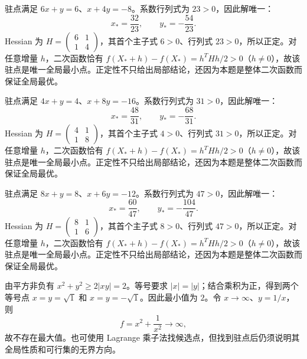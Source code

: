 \documentclass[UTF8,12pt,a4paper,fontset=fandol]{ctexart}
\begin{document}
\begin{solve}\label{ans:c34q17}
驻点满足 $6x+y=6$、$x+4y=-8$。系数行列式为 $23>0$，因此解唯一：
\[
x_*=\frac{32}{23},\qquad y_*=-\frac{54}{23}.
\]
Hessian 为 $H=\begin{pmatrix}6&1\\1&4\end{pmatrix}$，其首个主子式 $6>0$、行列式 $23>0$，所以正定。对任意增量 $h$，二次函数恰有 $f(X_*+h)-f(X_*)=h^THh/2>0$（$h\ne0$），故该驻点是唯一全局最小点。正定性不只给出局部结论，还因为本题是整体二次函数而保证全局最优。
\end{solve}

\begin{solve}\label{ans:c34q18}
驻点满足 $4x+y=4$、$x+8y=-16$。系数行列式为 $31>0$，因此解唯一：
\[
x_*=\frac{48}{31},\qquad y_*=-\frac{68}{31}.
\]
Hessian 为 $H=\begin{pmatrix}4&1\\1&8\end{pmatrix}$，其首个主子式 $4>0$、行列式 $31>0$，所以正定。对任意增量 $h$，二次函数恰有 $f(X_*+h)-f(X_*)=h^THh/2>0$（$h\ne0$），故该驻点是唯一全局最小点。正定性不只给出局部结论，还因为本题是整体二次函数而保证全局最优。
\end{solve}

\begin{solve}\label{ans:c34q19}
驻点满足 $8x+y=8$、$x+6y=-12$。系数行列式为 $47>0$，因此解唯一：
\[
x_*=\frac{60}{47},\qquad y_*=-\frac{104}{47}.
\]
Hessian 为 $H=\begin{pmatrix}8&1\\1&6\end{pmatrix}$，其首个主子式 $8>0$、行列式 $47>0$，所以正定。对任意增量 $h$，二次函数恰有 $f(X_*+h)-f(X_*)=h^THh/2>0$（$h\ne0$），故该驻点是唯一全局最小点。正定性不只给出局部结论，还因为本题是整体二次函数而保证全局最优。
\end{solve}

\begin{solve}\label{ans:c34q20}
由平方非负有 $x^2+y^2\ge2|xy|=2$。等号要求 $|x|=|y|$；结合乘积为正，得到两个等号点 $x=y=\sqrt{1}$ 和 $x=y=-\sqrt{1}$。因此最小值为 $2$。令 $x\to\infty$、$y=1/x$，则
\[
f=x^2+\frac{1}{x^2}\to\infty,
\]
故不存在最大值。也可使用 Lagrange 乘子法找候选点，但找到驻点后仍须说明其全局性质和可行集的无界方向。
\end{solve}
\end{document}
